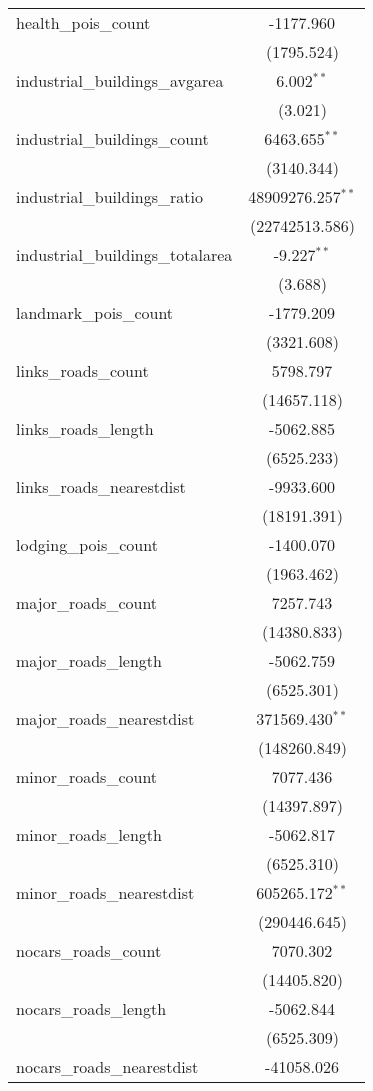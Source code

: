 \begin{table}[!htbp]
\begin{tabular}{@{\extracolsep{5pt}}lc}
 health_pois_count & -1177.960$^{}$ \\
  & (1795.524) \\
 industrial_buildings_avgarea & 6.002$^{**}$ \\
  & (3.021) \\
 industrial_buildings_count & 6463.655$^{**}$ \\
  & (3140.344) \\
 industrial_buildings_ratio & 48909276.257$^{**}$ \\
  & (22742513.586) \\
 industrial_buildings_totalarea & -9.227$^{**}$ \\
  & (3.688) \\
 landmark_pois_count & -1779.209$^{}$ \\
  & (3321.608) \\
 links_roads_count & 5798.797$^{}$ \\
  & (14657.118) \\
 links_roads_length & -5062.885$^{}$ \\
  & (6525.233) \\
 links_roads_nearestdist & -9933.600$^{}$ \\
  & (18191.391) \\
 lodging_pois_count & -1400.070$^{}$ \\
  & (1963.462) \\
 major_roads_count & 7257.743$^{}$ \\
  & (14380.833) \\
 major_roads_length & -5062.759$^{}$ \\
  & (6525.301) \\
 major_roads_nearestdist & 371569.430$^{**}$ \\
  & (148260.849) \\
 minor_roads_count & 7077.436$^{}$ \\
  & (14397.897) \\
 minor_roads_length & -5062.817$^{}$ \\
  & (6525.310) \\
 minor_roads_nearestdist & 605265.172$^{**}$ \\
  & (290446.645) \\
 nocars_roads_count & 7070.302$^{}$ \\
  & (14405.820) \\
 nocars_roads_length & -5062.844$^{}$ \\
  & (6525.309) \\
 nocars_roads_nearestdist & -41058.026$^{}$ \\

\end{tabular}
\end{table}
